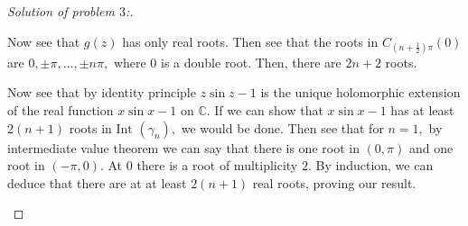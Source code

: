 \documentclass[letterpaper,11pt,twoside]{article}
\theoremstyle{proposition}
\theoremstyle{definition}
\theoremstyle{theorem}
\theoremstyle{definition}
\theoremstyle{definition}
\theoremstyle{definition}
\theoremstyle{lemma}
\theoremstyle{definition}
\theoremstyle{definition}
\theoremstyle{corollary}
\theoremstyle{definition}
\theoremstyle{definition}
\theoremstyle{definition}
\begin{document}
\begin{proof}[Solution of problem $3$:]
\begin{enumerate}
			Now see that $g(z)$ has only real roots. Then see that the roots in $C_{\left(n+ \frac{1}{2}\right)\pi}(0)$ are $0, \pm \pi, \dots, \pm n\pi,$ 
			where $0$ is a double root. Then, there are $2n+2$ roots. 
			
			Now see that by identity principle $z\sin z - 1$ is the unique holomorphic extension of the real function $x\sin x -1$ on $\mathbb{C}.$ If we 
			can show that $x \sin x -1$ has at least $2(n+1)$ roots in $ \text{Int }(\gamma_n),$ we would be done. Then see that for $n=1,$ by intermediate 
			value theorem we can say that there is one root in $(0, \pi)$ and one root in $(-\pi,0).$ At $0$ there is a root of multiplicity $2.$ By 
			induction, we can  deduce that there are at at least $2(n+1)$ real roots, proving our result. 
 		\end{enumerate}
	\end{proof}
\end{document}
